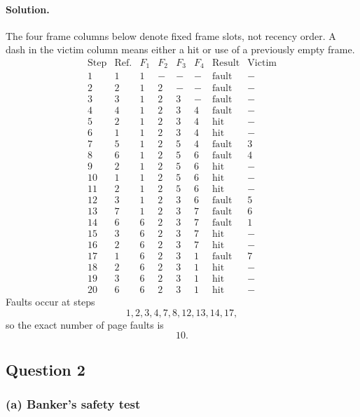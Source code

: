 \paragraph{Solution.}
The four frame columns below denote fixed frame slots, not recency
order.  A dash in the victim column means either a hit or use of a
previously empty frame.
\[
\begin{array}{c|c|c|c|c|c|c|c}
\mathrm{Step}&\mathrm{Ref.}&F_1&F_2&F_3&F_4&\mathrm{Result}&\mathrm{Victim}\\ \hline
1 &1&1&-&-&-&\mathrm{fault}&-\\
2 &2&1&2&-&-&\mathrm{fault}&-\\
3 &3&1&2&3&-&\mathrm{fault}&-\\
4 &4&1&2&3&4&\mathrm{fault}&-\\
5 &2&1&2&3&4&\mathrm{hit}&-\\
6 &1&1&2&3&4&\mathrm{hit}&-\\
7 &5&1&2&5&4&\mathrm{fault}&3\\
8 &6&1&2&5&6&\mathrm{fault}&4\\
9 &2&1&2&5&6&\mathrm{hit}&-\\
10&1&1&2&5&6&\mathrm{hit}&-\\
11&2&1&2&5&6&\mathrm{hit}&-\\
12&3&1&2&3&6&\mathrm{fault}&5\\
13&7&1&2&3&7&\mathrm{fault}&6\\
14&6&6&2&3&7&\mathrm{fault}&1\\
15&3&6&2&3&7&\mathrm{hit}&-\\
16&2&6&2&3&7&\mathrm{hit}&-\\
17&1&6&2&3&1&\mathrm{fault}&7\\
18&2&6&2&3&1&\mathrm{hit}&-\\
19&3&6&2&3&1&\mathrm{hit}&-\\
20&6&6&2&3&1&\mathrm{hit}&-
\end{array}
\]
Faults occur at steps
\[
1,2,3,4,7,8,12,13,14,17,
\]
so the exact number of page faults is
\[
\boxed{10}.
\]

\subsection*{Question 2}

\subsubsection*{(a) Banker's safety test}

